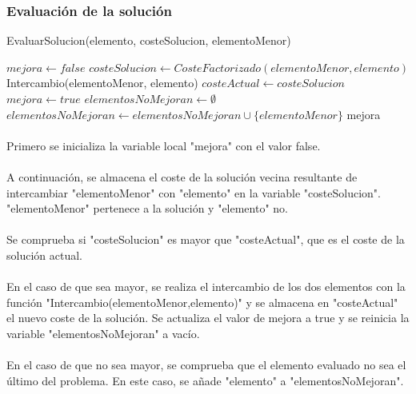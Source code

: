 \documentclass{article}
\begin{document}
	\subsubsection{Evaluación de la solución}
	\begin{algorithm}[H]
		\caption{EvaluarSolucion(elemento, costeSolucion, elementoMenor)}
		\begin{algorithmic}
			\STATE $mejora \leftarrow false$
			\STATE $costeSolucion \leftarrow CosteFactorizado(elementoMenor, elemento)$
			\STATE Intercambio(elementoMenor, elemento)
			\STATE $costeActual \leftarrow costeSolucion$
			\STATE $mejora \leftarrow true$
			\STATE $elementosNoMejoran \leftarrow \emptyset$
			\STATE $elementosNoMejoran \leftarrow elementosNoMejoran \cup \{elementoMenor\}$
			\ENDIF
			\RETURN mejora
			\	
		\end{algorithmic}
	\end{algorithm}
	
	\paragraph{}Primero se inicializa la variable local "mejora" con el valor false.
	
	\paragraph{}A continuación, se almacena el coste de la solución vecina resultante de intercambiar "elementoMenor" con "elemento" en la variable "costeSolucion". "elementoMenor" pertenece a la solución y "elemento" no.
	
	\paragraph{}Se comprueba si "costeSolucion" es mayor que "costeActual", que es el coste de la solución actual.
	
	\paragraph{}En el caso de que sea mayor, se realiza el intercambio de los dos elementos con la función "Intercambio(elementoMenor,elemento)" y se almacena en "costeActual" el nuevo coste de la solución. Se actualiza el valor de mejora a true y se reinicia la variable "elementosNoMejoran" a vacío.
	
	\paragraph{}En el caso de que no sea mayor, se comprueba que el elemento evaluado no sea el último del problema. En este caso, se añade "elemento" a "elementosNoMejoran".
	
\end{document}
